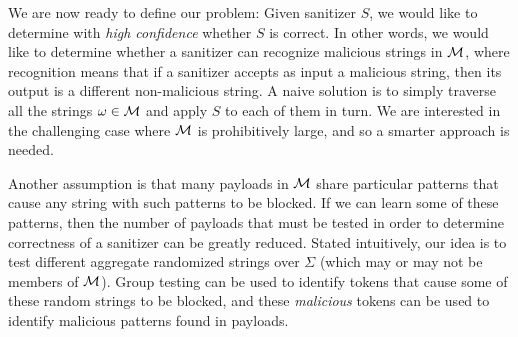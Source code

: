 We are now ready to define our problem: Given sanitizer $S$, we would like to determine with \emph{high confidence} whether $S$ is correct. In other words, we would like to determine whether a sanitizer can recognize malicious strings in $\cal{M}$, where recognition means that if a sanitizer accepts as input a malicious string, then its output is a different non-malicious string. A naive solution is to simply traverse all the strings $\omega \in {\cal M}$ and apply $S$ to each of them in turn. We are interested in the challenging case where ${\cal M}$ is prohibitively large, and so a smarter approach is needed.

Another assumption is that many payloads in $\cal{M}$ share particular patterns that cause any string with such patterns to be blocked. If we can learn some of these patterns, then the number of payloads that must be tested in order to determine correctness of a sanitizer can be greatly reduced. Stated intuitively, our idea is to test different aggregate randomized strings over $\Sigma$ (which may or may not be members of ${\cal M}$). Group testing can be used to identify tokens that cause some of these random strings to be blocked, and these \emph{malicious} tokens can be used to identify malicious patterns found in payloads. 



